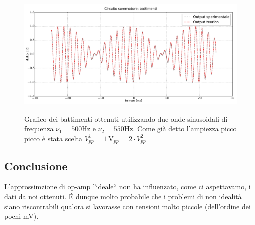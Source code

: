 \begin{figure}[ht]
 \centering
   {\includegraphics[width=15cm]{../E01/latex/battimenti_ideali.pdf}}
 \caption{Grafico dei battimenti ottenuti utilizzando due onde sinusoidali di frequenza $\nu_1=500 \si{\hertz}$ e $\nu_2=550 \si{\hertz}$. Come già detto l'ampiezza picco picco è stata scelta $V^1_{pp}=\SI{1}{\volt}_{pp} =2 \cdot V^2_{pp}$ }
 \label{gr:batt1}
\end{figure}









\subsection*{Conclusione}

L'approssimzione di op-amp ''ideale`` non ha influenzato, come ci aspettavamo, i dati da noi ottenuti. \'E dunque molto probabile che i problemi di non idealità siano riscontrabili qualora si lavorasse con tensioni molto piccole (dell'ordine dei pochi \si{\milli\volt}). 












